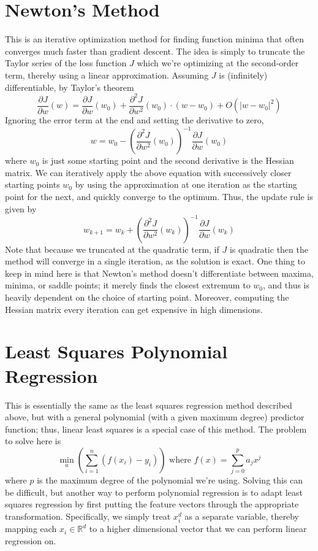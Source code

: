\documentclass{article}
\begin{document}
\section{Newton's Method}
This is an iterative optimization method for finding function minima that often converges much faster than gradient descent. The idea is simply to truncate the Taylor series of the loss function $ J $ which we're optimizing at the second-order term, thereby using a linear approximation. Assuming $ J $ is (infinitely) differentiable, by Taylor's theorem
$$ \frac{\partial J}{\partial w}(w) = \frac{\partial J}{\partial w}(w_0) + \frac{\partial^2 J}{\partial w^2}(w_0) \cdot (w - w_0) + O(|w - w_0|^2) $$
Ignoring the error term at the end and setting the derivative to zero,
$$ w = w_0 - \left( \frac{\partial^2 J}{\partial w^2}(w_0) \right)^{-1} \frac{\partial J}{\partial w}(w_0) $$
where $ w_0 $ is just some starting point and the second derivative is the Hessian matrix. We can iteratively apply the above equation with successively closer starting points $ w_0 $ by using the approximation at one iteration as the starting point for the next, and quickly converge to the optimum. Thus, the update rule is given by
$$ w_{k + 1} = w_k + \left( \frac{\partial^2 J}{\partial w^2}(w_k) \right)^{-1} \frac{\partial J}{\partial w}(w_k)  $$
Note that because we truncated at the quadratic term, if $ J $ is quadratic then the method will converge in a single iteration, as the solution is exact. One thing to keep in mind here is that Newton's method doesn't differentiate between maxima, minima, or saddle points; it merely finds the closest extremum to $ w_0 $, and thus is heavily dependent on the choice of starting point. Moreover, computing the Hessian matrix every iteration can get expensive in high dimensions.

\section{Least Squares Polynomial Regression}
This is essentially the same as the least squares regression method described above, but with a general polynomial (with a given maximum degree) predictor function; thus, linear least squares is a special case of this method. The problem to solve here is
$$ \min_{a} \left( \sum_{i = 1}^n (f(x_i) - y_i) \right) \text{ where } f(x) = \sum_{j = 0}^p a_j x^j $$
    where $ p $ is the maximum degree of the polynomial we're using. Solving this can be difficult, but another way to perform polynomial regression is to adapt least squares regression by first putting the feature vectors through the appropriate transformation. Specifically, we simply treat $ x_i^d $ as a separate variable, thereby mapping each $ x_i \in \mathbb{R}^d $ to a higher dimensional vector that we can perform linear regression on.
\end{document}
